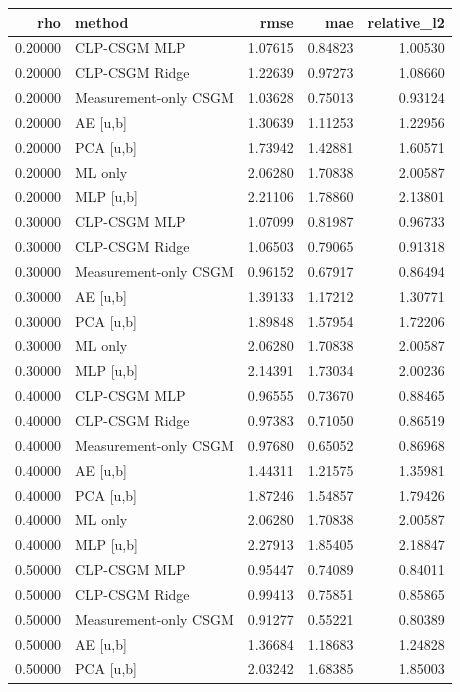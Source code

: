 \begin{tabular}{rlrrr}
\toprule
rho & method & rmse & mae & relative\_l2 \\
\midrule
0.20000 & CLP-CSGM MLP & 1.07615 & 0.84823 & 1.00530 \\
0.20000 & CLP-CSGM Ridge & 1.22639 & 0.97273 & 1.08660 \\
0.20000 & Measurement-only CSGM & 1.03628 & 0.75013 & 0.93124 \\
0.20000 & AE [u,b] & 1.30639 & 1.11253 & 1.22956 \\
0.20000 & PCA [u,b] & 1.73942 & 1.42881 & 1.60571 \\
0.20000 & ML only & 2.06280 & 1.70838 & 2.00587 \\
0.20000 & MLP [u,b] & 2.21106 & 1.78860 & 2.13801 \\
0.30000 & CLP-CSGM MLP & 1.07099 & 0.81987 & 0.96733 \\
0.30000 & CLP-CSGM Ridge & 1.06503 & 0.79065 & 0.91318 \\
0.30000 & Measurement-only CSGM & 0.96152 & 0.67917 & 0.86494 \\
0.30000 & AE [u,b] & 1.39133 & 1.17212 & 1.30771 \\
0.30000 & PCA [u,b] & 1.89848 & 1.57954 & 1.72206 \\
0.30000 & ML only & 2.06280 & 1.70838 & 2.00587 \\
0.30000 & MLP [u,b] & 2.14391 & 1.73034 & 2.00236 \\
0.40000 & CLP-CSGM MLP & 0.96555 & 0.73670 & 0.88465 \\
0.40000 & CLP-CSGM Ridge & 0.97383 & 0.71050 & 0.86519 \\
0.40000 & Measurement-only CSGM & 0.97680 & 0.65052 & 0.86968 \\
0.40000 & AE [u,b] & 1.44311 & 1.21575 & 1.35981 \\
0.40000 & PCA [u,b] & 1.87246 & 1.54857 & 1.79426 \\
0.40000 & ML only & 2.06280 & 1.70838 & 2.00587 \\
0.40000 & MLP [u,b] & 2.27913 & 1.85405 & 2.18847 \\
0.50000 & CLP-CSGM MLP & 0.95447 & 0.74089 & 0.84011 \\
0.50000 & CLP-CSGM Ridge & 0.99413 & 0.75851 & 0.85865 \\
0.50000 & Measurement-only CSGM & 0.91277 & 0.55221 & 0.80389 \\
0.50000 & AE [u,b] & 1.36684 & 1.18683 & 1.24828 \\
0.50000 & PCA [u,b] & 2.03242 & 1.68385 & 1.85003 \\

\end{tabular}
